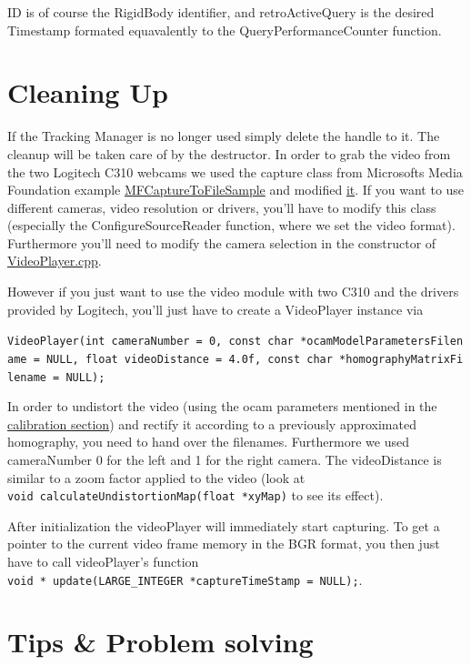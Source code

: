 \documentclass[]{article}
\begin{document}
ID is of course the RigidBody identifier, and retroActiveQuery is the
desired Timestamp formated equavalently to the QueryPerformanceCounter
function.

\section{Cleaning Up}\label{cleaning-up}

If the Tracking Manager is no longer used simply delete the handle to
it. The cleanup will be taken care of by the destructor. In order to
grab the video from the two Logitech C310 webcams we used the capture
class from Microsofts Media Foundation example
\href{https://msdn.microsoft.com/en-us/library/windows/desktop/ee663604\%28v=vs.85\%29.aspx}{MFCaptureToFileSample}
and modified
\href{https://github.com/ands/OculusMeetsAR/blob/master/ARLib/src/Video/CCapture.cpp}{it}.
If you want to use different cameras, video resolution or drivers,
you'll have to modify this class (especially the ConfigureSourceReader
function, where we set the video format). Furthermore you'll need to
modify the camera selection in the constructor of
\href{https://github.com/ands/OculusMeetsAR/blob/master/ARLib/src/Video/videoplayer.cpp}{VideoPlayer.cpp}.

However if you just want to use the video module with two C310 and the
drivers provided by Logitech, you'll just have to create a VideoPlayer
instance via

\texttt{VideoPlayer(int\ cameraNumber\ =\ 0,\ const\ char\ *ocamModelParametersFilename\ =\ NULL,\ float\ videoDistance\ =\ 4.0f,\ const\ char\ *homographyMatrixFilename\ =\ NULL);}

In order to undistort the video (using the ocam parameters mentioned in
the
\href{https://github.com/ands/OculusMeetsAR/wiki/Calibration}{calibration
section}) and rectify it according to a previously approximated
homography, you need to hand over the filenames. Furthermore we used
cameraNumber 0 for the left and 1 for the right camera. The
videoDistance is similar to a zoom factor applied to the video (look at
\texttt{void\ calculateUndistortionMap(float\ *xyMap)} to see its
effect).

After initialization the videoPlayer will immediately start capturing.
To get a pointer to the current video frame memory in the BGR format,
you then just have to call videoPlayer's function
\texttt{void\ *\ update(LARGE\_INTEGER\ *captureTimeStamp\ =\ NULL);}.

\section{Tips \& Problem solving}\label{tips-problem-solving}
\end{document}

